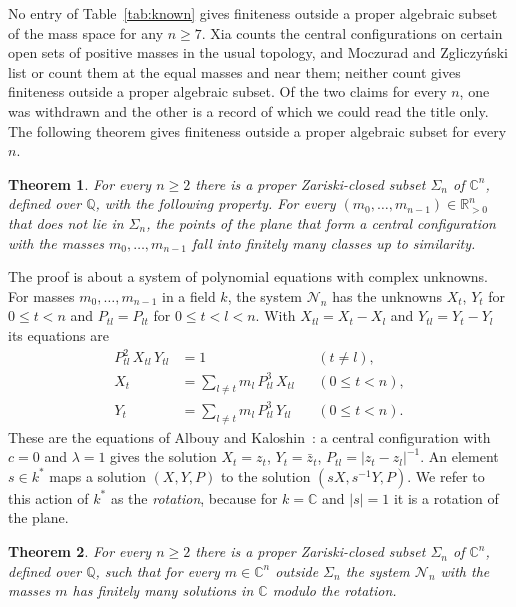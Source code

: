 \documentclass[11pt]{amsart}
\newtheorem{theorem}{Theorem}[section]
\theoremstyle{definition}
\theoremstyle{remark}
\numberwithin{equation}{section}
\newcommand{\QQ}{\mathbb{Q}}
\newcommand{\CC}{\mathbb{C}}
\newcommand{\RR}{\mathbb{R}}
\newcommand{\cN}{\mathcal{N}}
\begin{document}
No entry of Table~\ref{tab:known} gives finiteness outside a proper algebraic subset of the mass space
for any $n \ge 7$. Xia counts the central configurations on certain open sets of positive masses in the
usual topology, and Moczurad and Zgliczy\'nski list or count them at the equal masses and near them;
neither count gives finiteness outside a proper algebraic subset. Of the two claims for every $n$, one was withdrawn and the other is a record of which we could read the title only. The following theorem gives finiteness outside a proper algebraic
subset for every $n$.

\begin{theorem}\label{thm:main}
For every $n \ge 2$ there is a proper Zariski-closed subset $\Sigma_n$ of $\CC^n$, defined over $\QQ$,
with the following property. For every $(m_0, \dots, m_{n-1}) \in \RR_{>0}^n$ that does not lie in
$\Sigma_n$, the points of the plane that form a central configuration with the masses
$m_0, \dots, m_{n-1}$ fall into finitely many classes up to similarity.
\end{theorem}

The proof is about a system of polynomial equations with complex unknowns. For masses $m_0, \dots, m_{n-1}$ in
a field $k$, the system $\cN_n$ has the unknowns $X_t$, $Y_t$ for $0 \le t < n$ and $P_{tl} = P_{lt}$ for
$0 \le t < l < n$. With $X_{tl} = X_t - X_l$ and $Y_{tl} = Y_t - Y_l$ its equations are
\begin{align}
  P_{tl}^2\, X_{tl}\, Y_{tl} &= 1 && (t \ne l), \label{eq:N1}\\
  X_t &= \sum_{l \ne t} m_l\, P_{tl}^3\, X_{tl} && (0 \le t < n), \label{eq:N2}\\
  Y_t &= \sum_{l \ne t} m_l\, P_{tl}^3\, Y_{tl} && (0 \le t < n). \label{eq:N3}
\end{align}
These are the equations of Albouy and Kaloshin~\cite{albouykaloshin2012}: a central configuration with
$c = 0$ and $\lambda = 1$ gives the solution $X_t = z_t$, $Y_t = \bar z_t$, $P_{tl} = |z_t - z_l|^{-1}$.
An element $s \in k^{*}$ maps a solution $(X, Y, P)$ to the solution $(sX, s^{-1}Y, P)$. We refer to
this action of $k^{*}$ as the \emph{rotation}, because for $k = \CC$ and $|s| = 1$ it is a rotation of
the plane.

\begin{theorem}\label{thm:Nn}
For every $n \ge 2$ there is a proper Zariski-closed subset $\Sigma_n$ of $\CC^n$, defined over $\QQ$,
such that for every $m \in \CC^n$ outside $\Sigma_n$ the system $\cN_n$ with the masses $m$ has finitely
many solutions in $\CC$ modulo the rotation.
\end{theorem}
\end{document}
